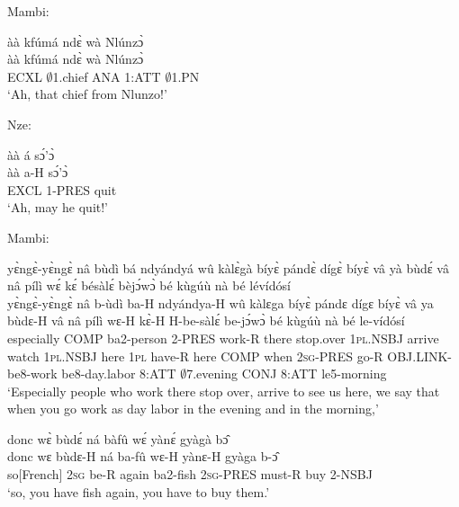 \noindent Mambi:

\begin{exe} 
\exC\label{232}  
  \glll  àà kfúmá ndɛ̀ wà Nlúnzɔ̀ \\
        àà kfúmá ndɛ̀ wà Nlúnzɔ̀ \\
        ECXL $\emptyset$1.chief ANA  1:ATT $\emptyset$1.PN  \\
    \trans `Ah, that chief from Nlunzo!'
\end{exe}

\noindent Nze:

\begin{exe} 
\exC\label{233}
  \glll àà  á sɔ́'ɔ̀ \\
       àà  a-H sɔ́'ɔ̀ \\
         EXCL 1-PRES quit  \\
    \trans `Ah, may he quit!'
\end{exe}

\noindent Mambi:

\begin{exe} 
\exC\label{234} 
  \glll  yɛ̀ngɛ̀-yɛ̀ngɛ̀ nâ bùdì bá ndyándyá wû kàlɛ̀gà bíyɛ̀ pándɛ̀ dígɛ̀ bíyɛ̀ vâ yà bùdɛ́ vâ nâ pílì wɛ́ kɛ́ bésàlɛ́ bèjɔ́wɔ̀ bé kùgúù nà bé lévídósí\\
      yɛ̀ngɛ̀-yɛ̀ngɛ̀ nâ b-ùdì ba-H ndyándya-H wû kàlɛga bíyɛ̀ pándɛ dígɛ bíyɛ̀ vâ ya bùdɛ-H vâ nâ pílì wɛ-H kɛ̀-H H-be-sàlɛ́ be-jɔ́wɔ̀ bé kùgúù nà bé le-vídósí \\
       especially COMP ba2-person 2-PRES work-R there stop.over 1\textsc{pl}.NSBJ arrive watch 1\textsc{pl}.NSBJ here 1\textsc{pl} have-R here COMP when 2\textsc{sg}-PRES go-R OBJ.LINK-be8-work be8-day.labor 8:ATT $\emptyset$7.evening CONJ 8:ATT le5-morning   \\
    \trans `Especially people who work there stop over, arrive to see us here, we say that when you go work as day labor in the evening and in the morning,'
\end{exe}

\begin{exe} 
\exC\label{235} 
  \glll  donc wɛ̀ bùdɛ́ ná bàfû wɛ́ yànɛ́ gyàgà bɔ̂ \\
       donc wɛ bùdɛ-H ná ba-fû wɛ-H yànɛ-H gyàga b-ɔ̂ \\
        so[French] 2\textsc{sg} be-R again ba2-fish 2\textsc{sg}-PRES must-R buy 2-NSBJ  \\
    \trans `so, you have fish again, you have to buy them.'
\end{exe}

